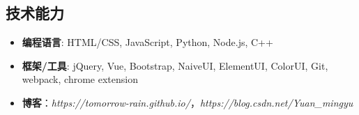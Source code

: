 \documentclass{resume}
\begin{document}
\begin{spacing}{1.2}
\vspace{0.2em}

\section{技术能力}
\begin{itemize}[parsep=0.8ex]
  \item \textbf{编程语言}: HTML/CSS, JavaScript, Python, Node.js, C++
  \item \textbf{框架/工具}: jQuery, Vue, Bootstrap, NaiveUI, ElementUI, ColorUI, Git, webpack, chrome extension
  \item \textbf{博客}：\textit{https://tomorrow-rain.github.io/}，\textit{https://blog.csdn.net/Yuan\_mingyu}
\end{itemize}





%
%
\end{spacing}
\end{document}
